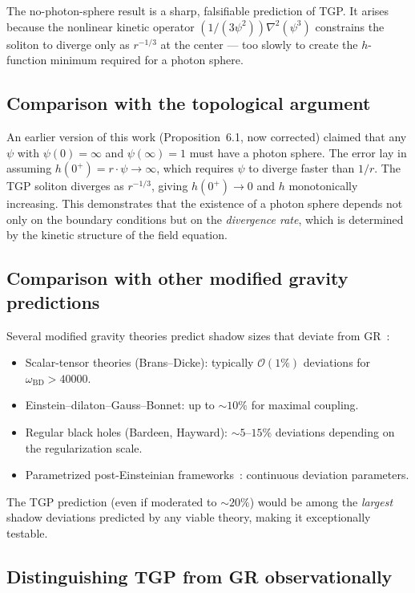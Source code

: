\documentclass[11pt,a4paper]{article}
\theoremstyle{definition}
\theoremstyle{remark}
\begin{document}
The no-photon-sphere result is a sharp, falsifiable prediction of TGP.
It arises because the nonlinear kinetic operator
$(1/(3\psi^2))\nabla^2(\psi^3)$ constrains the soliton to diverge
only as $r^{-1/3}$ at the center --- too slowly to create the
$h$-function minimum required for a photon sphere.

\subsection{Comparison with the topological argument}

An earlier version of this work (Proposition~6.1, now corrected)
claimed that any $\psi$ with $\psi(0) = \infty$ and $\psi(\infty) = 1$
must have a photon sphere.  The error lay in assuming
$h(0^+) = r\cdot\psi \to \infty$, which requires $\psi$ to diverge
faster than $1/r$.  The TGP soliton diverges as $r^{-1/3}$, giving
$h(0^+) \to 0$ and $h$ monotonically increasing.  This demonstrates
that the existence of a photon sphere depends not only on the boundary
conditions but on the \emph{divergence rate}, which is determined by the
kinetic structure of the field equation.

\subsection{Comparison with other modified gravity predictions}

Several modified gravity theories predict shadow sizes that deviate from
GR~\cite{Perlick2022,Cunha2018,Vagnozzi2023}:
\begin{itemize}[nosep]
  \item Scalar-tensor theories (Brans--Dicke): typically
    $\mathcal{O}(1\%)$ deviations for $\omega_{\mathrm{BD}} > 40000$.
  \item Einstein--dilaton--Gauss--Bonnet: up to $\sim 10\%$ for
    maximal coupling.
  \item Regular black holes (Bardeen, Hayward): $\sim 5\text{--}15\%$
    deviations depending on the regularization scale.
  \item Parametrized post-Einsteinian frameworks~\cite{Rezzolla2014,%
    Johannsen2013}: continuous deviation parameters.
\end{itemize}
The TGP prediction (even if moderated to $\sim 20\%$) would be among the
\emph{largest} shadow deviations predicted by any viable theory, making
it exceptionally testable.

\subsection{Distinguishing TGP from GR observationally}
\end{document}
